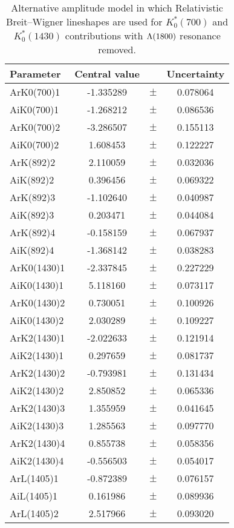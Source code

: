 \clearpage

\begin{table}
\centering
\caption{Alternative amplitude model in which Relativistic Breit--Wigner lineshapes are used for $K^*_0(700)$ and $K^*_0(1430)$ contributions with ${\Lambda}(1800)$ resonance removed.}
\begin{tiny}
\begin{tabular}{lccc}
\toprule
Parameter & Central value & & Uncertainty\\
\midrule
ArK0(700)1 & -1.335289 & $\pm$ & 0.078064 \\
AiK0(700)1 & -1.268212 & $\pm$ & 0.086536 \\
ArK0(700)2 & -3.286507 & $\pm$ & 0.155113 \\
AiK0(700)2 & 1.608453 & $\pm$ & 0.122227 \\
ArK(892)2 & 2.110059 & $\pm$ & 0.032036 \\
AiK(892)2 & 0.396456 & $\pm$ & 0.069322 \\
ArK(892)3 & -1.102640 & $\pm$ & 0.040987 \\
AiK(892)3 & 0.203471 & $\pm$ & 0.044084 \\
ArK(892)4 & -0.158159 & $\pm$ & 0.067937 \\
AiK(892)4 & -1.368142 & $\pm$ & 0.038283 \\
ArK0(1430)1 & -2.337845 & $\pm$ & 0.227229 \\
AiK0(1430)1 & 5.118160 & $\pm$ & 0.073117 \\
ArK0(1430)2 & 0.730051 & $\pm$ & 0.100926 \\
AiK0(1430)2 & 2.030289 & $\pm$ & 0.109227 \\
ArK2(1430)1 & -2.022633 & $\pm$ & 0.121914 \\
AiK2(1430)1 & 0.297659 & $\pm$ & 0.081737 \\
ArK2(1430)2 & -0.793981 & $\pm$ & 0.131434 \\
AiK2(1430)2 & 2.850852 & $\pm$ & 0.065336 \\
ArK2(1430)3 & 1.355959 & $\pm$ & 0.041645 \\
AiK2(1430)3 & 1.285563 & $\pm$ & 0.097770 \\
ArK2(1430)4 & 0.855738 & $\pm$ & 0.058356 \\
AiK2(1430)4 & -0.556503 & $\pm$ & 0.054017 \\
ArL(1405)1 & -0.872389 & $\pm$ & 0.076157 \\
AiL(1405)1 & 0.161986 & $\pm$ & 0.089936 \\
ArL(1405)2 & 2.517966 & $\pm$ & 0.093020 \\

\end{tabular}
\end{tiny}
\end{table}
